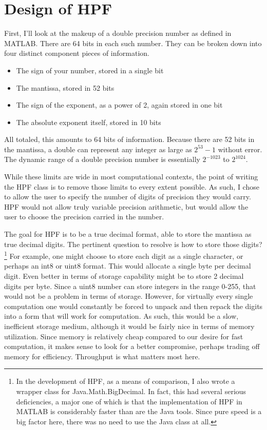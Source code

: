 \documentclass[a4paper,12pt]{article}
\begin{document}
\section{Design of HPF}

First, I'll look at the makeup of a double precision number as defined in MATLAB. There are 64 bits in each such number. They can be broken down into four distinct component pieces of information.

\begin{itemize}
  \item{The sign of your number, stored in a single bit}
  \item{The mantissa, stored in 52 bits}
  \item{The sign of the exponent, as a power of 2, again stored in one bit}
  \item{The absolute exponent itself, stored in 10 bits}
\end{itemize}

All totaled, this amounts to 64 bits of information. Because there are 52 bits in the mantissa, a double can represent any integer as large as $2^{53} -1$ without error. The dynamic range of a double precision number is essentially $2^{-1023}$ to $2^{1024}$.

While these limits are wide in most computational contexts, the point of writing the HPF class is to remove those limits to every extent possible. As such, I chose to allow the user to specify the number of digits of precision they would carry. HPF would not allow truly variable precision arithmetic, but would allow the user to choose the precision carried in the number.

The goal for HPF is to be a true decimal format, able to store the mantissa as true decimal digits. The pertinent question to resolve is how to store those digits? \footnote{In the development of HPF, as a means of comparison, I also wrote a wrapper class for Java.Math.BigDecimal. In fact, this had several serious deficiencies, a major one of which is that the implementation of HPF in MATLAB is considerably faster than are the Java tools. Since pure speed is a big factor here, there was no need to use the Java class at all.} For example, one might choose to store each digit as a single character, or perhaps an int8 or uint8 format. This would allocate a single byte per decimal digit. Even better in terms of storage capability might be to store 2 decimal digits per byte. Since a uint8 number can store integers in the range 0-255, that would not be a problem in terms of storage. However, for virtually every single computation one would constantly be forced to unpack and then repack the digits into a form that will work for computation. As such, this would be a slow, inefficient storage medium, although it would be fairly nice in terms of memory utilization. Since memory is relatively cheap compared to our desire for fast computation, it makes sense to look for a better compromise, perhaps trading off memory for efficiency. Throughput is what matters most here.
\end{document}
